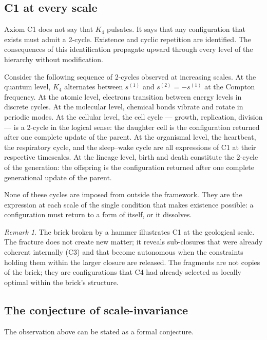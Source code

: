 \documentclass[12pt,a4paper]{article}
\theoremstyle{plain}
\theoremstyle{definition}
\theoremstyle{remark}
\newtheorem{remark}[theorem]{Remark}
\newcommand{\Kfour}{K_4}
\begin{document}
\subsection{C1 at every scale}

Axiom C1 does not say that $\Kfour$ pulsates. It says that any configuration that
exists must admit a 2-cycle. Existence and cyclic repetition are identified. The
consequences of this identification propagate upward through every level of the
hierarchy without modification.

Consider the following sequence of 2-cycles observed at increasing scales. At the
quantum level, $\Kfour$ alternates between $s^{(1)}$ and $s^{(2)} = -s^{(1)}$ at
the Compton frequency. At the atomic level, electrons transition between energy
levels in discrete cycles. At the molecular level, chemical bonds vibrate and rotate
in periodic modes. At the cellular level, the cell cycle --- growth, replication,
division --- is a 2-cycle in the logical sense: the daughter cell is the configuration
returned after one complete update of the parent. At the organismal level, the
heartbeat, the respiratory cycle, and the sleep--wake cycle are all expressions of
C1 at their respective timescales. At the lineage level, birth and death constitute
the 2-cycle of the generation: the offspring is the configuration returned after one
complete generational update of the parent.

None of these cycles are imposed from outside the framework. They are the expression
at each scale of the single condition that makes existence possible: a configuration
must return to a form of itself, or it dissolves.

\begin{remark}
The brick broken by a hammer illustrates C1 at the geological scale. The fracture
does not create new matter; it reveals sub-closures that were already coherent
internally (C3) and that become autonomous when the constraints holding them within
the larger closure are released. The fragments are not copies of the brick; they are
configurations that C4 had already selected as locally optimal within the brick's
structure.
\end{remark}

\subsection{The conjecture of scale-invariance}

The observation above can be stated as a formal conjecture.
\end{document}
